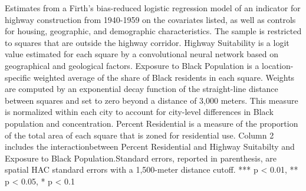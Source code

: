 \begin{table}[h]
\begin{threeparttable}
\begin{tablenotes}[flushleft]
\item Estimates from a Firth's bias-reduced logistic regression model of an indicator for highway construction from 1940-1959 on the covariates listed, as well as controls for housing, geographic, and demographic characteristics. The sample is restricted to squares that are outside the highway corridor. Highway Suitability is a logit value estimated for each square by a convolutional neural network based on geographical and geological factors. Exposure to Black Population is a location-specific weighted average of the share of Black residents in each square. Weights are computed by an exponential decay function of the straight-line distance between squares and set to zero beyond a distance of 3,000 meters. This measure is normalized within each city to account for city-level differences in Black population and concentration. Percent Residential is a measure of the proportion of the total area of each square that is zoned for residential use. Column 2 includes the interactionbetween Percent Residential and Highway Suitabilty and Exposure to Black Population.Standard errors, reported in parenthesis, are \textcite{conley_gmm_1999} spatial HAC standard errors with a 1,500-meter distance cutoff.  *** p < 0.01, ** p < 0.05, * p < 0.1
\end{tablenotes}
\end{threeparttable}
\end{table}
